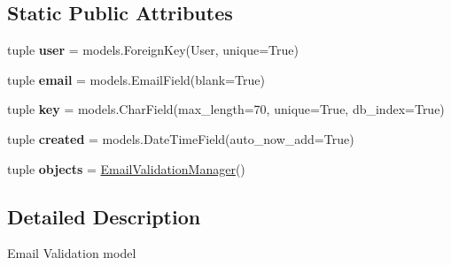 \subsection*{Static Public Attributes}
\begin{DoxyCompactItemize}
\item 
\hypertarget{classsouvenir_1_1userprofile_1_1models_1_1EmailValidation_af926bf1ee9045ca2f10a672c0283fc42}{tuple {\bfseries user} = models.\-Foreign\-Key(User, unique=True)}\label{classsouvenir_1_1userprofile_1_1models_1_1EmailValidation_af926bf1ee9045ca2f10a672c0283fc42}

\item 
\hypertarget{classsouvenir_1_1userprofile_1_1models_1_1EmailValidation_a323cfb21ae6024c38cfc31bc887c0dfa}{tuple {\bfseries email} = models.\-Email\-Field(blank=True)}\label{classsouvenir_1_1userprofile_1_1models_1_1EmailValidation_a323cfb21ae6024c38cfc31bc887c0dfa}

\item 
\hypertarget{classsouvenir_1_1userprofile_1_1models_1_1EmailValidation_a87286c505fd4db67b9eebf6f39d85095}{tuple {\bfseries key} = models.\-Char\-Field(max\-\_\-length=70, unique=True, db\-\_\-index=True)}\label{classsouvenir_1_1userprofile_1_1models_1_1EmailValidation_a87286c505fd4db67b9eebf6f39d85095}

\item 
\hypertarget{classsouvenir_1_1userprofile_1_1models_1_1EmailValidation_aadacf6140f4e605b7c61eade1dae6657}{tuple {\bfseries created} = models.\-Date\-Time\-Field(auto\-\_\-now\-\_\-add=True)}\label{classsouvenir_1_1userprofile_1_1models_1_1EmailValidation_aadacf6140f4e605b7c61eade1dae6657}

\item 
\hypertarget{classsouvenir_1_1userprofile_1_1models_1_1EmailValidation_a36fc31a9a736784f1aeb079c3c5ab9ba}{tuple {\bfseries objects} = \hyperlink{classsouvenir_1_1userprofile_1_1models_1_1EmailValidationManager}{Email\-Validation\-Manager}()}\label{classsouvenir_1_1userprofile_1_1models_1_1EmailValidation_a36fc31a9a736784f1aeb079c3c5ab9ba}

\end{DoxyCompactItemize}


\subsection{Detailed Description}
\begin{DoxyVerb}Email Validation model
\end{DoxyVerb}
 

